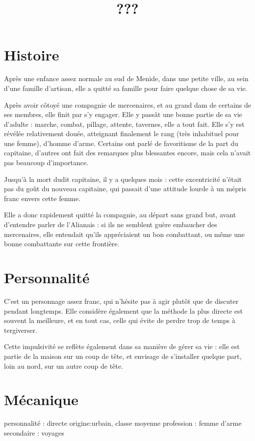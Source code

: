 \documentclass[10pt,a4paper]{article}
\title{???}
\date{}
\begin{document}
\maketitle
\section{Histoire}
Après une enfance assez normale au sud de Menide, dans une petite ville, au sein d'une famille d'artisan, elle a quitté sa famille pour faire quelque chose de sa vie. 

Après avoir côtoyé une compagnie de mercenaires, et au grand dam de certains de ses membres, elle finit par s'y engager. Elle y passât une bonne partie de sa vie d'adulte : marche, combat, pillage, attente, tavernes, elle a tout fait. Elle s'y est révélée relativement douée, atteignant finalement le rang (très inhabituel pour une femme), d'homme d'arme. Certains ont parlé de favoritisme de la part du capitaine, d'autres ont fait des remarques plus blessantes encore, mais cela n'avait pas beaucoup d'importance.

Jusqu'à la mort dudit capitaine, il y a quelques mois : cette excentricité n'était pas du goût du nouveau capitaine, qui passait d'une attitude lourde à un mépris franc envers cette femme.

Elle a donc rapidement quitté la compagnie, au départ sans grand but, avant d'entendre parler de l'Alianais : si ils ne semblent guère embaucher des mercenaires, elle entendait qu'ils appréciaient un bon combattant, ou même une bonne combattante sur cette frontière.
\section{Personnalité}
C'est un personnage assez franc, qui n'hésite pas à agir plutôt que de discuter pendant longtemps. Elle considère également que la méthode la plus directe est souvent la meilleure, et en tout cas, celle qui évite de perdre trop de temps à tergiverser.

Cette impulsivité se reflète également dans sa manière de gérer sa vie : elle est partie de la maison sur un coup de tête, et envisage de s'installer quelque part, loin au nord, sur un autre coup de tête.
\section{Mécanique}
personnalité : directe
origine:urbain, classe moyenne
profession : femme d'arme
secondaire : voyages
\end{document}
